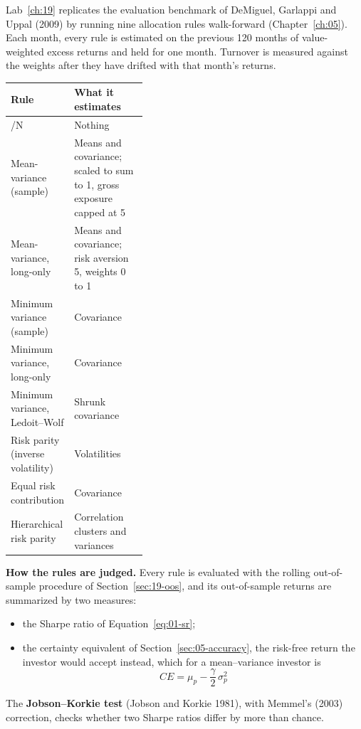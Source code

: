 Lab~\ref{ch:19} replicates the evaluation benchmark of DeMiguel, Garlappi and Uppal (2009) by running nine allocation rules walk-forward (Chapter~\ref{ch:05}). Each month, every rule is estimated on the previous 120 months of value-weighted excess returns and held for one month. Turnover is measured against the weights after they have drifted with that month's returns.

\begin{center}
\small
\begin{tabularx}{0.9\linewidth}{@{}>{\raggedright\arraybackslash}p{0.38\linewidth}>{\raggedright\arraybackslash}X@{}}
\toprule
Rule & What it estimates \\
\midrule
1/N & Nothing \\
Mean-variance (sample) & Means and covariance; scaled to sum to 1, gross exposure capped at 5 \\
Mean-variance, long-only & Means and covariance; risk aversion 5, weights 0 to 1 \\
Minimum variance (sample) & Covariance \\
Minimum variance, long-only & Covariance \\
Minimum variance, Ledoit--Wolf & Shrunk covariance \\
Risk parity (inverse volatility) & Volatilities \\
Equal risk contribution & Covariance \\
Hierarchical risk parity & Correlation clusters and variances \\
\bottomrule
\end{tabularx}
\end{center}

\textbf{How the rules are judged.} Every rule is evaluated with the rolling out-of-sample procedure of Section~\ref{sec:19-oos}, and its out-of-sample returns are summarized by two measures:
\begin{itemize}
  \item the Sharpe ratio of Equation~\eqref{eq:01-sr};
  \item the certainty equivalent of Section~\ref{sec:05-accuracy}, the risk-free return the investor would accept instead, which for a mean--variance investor is
  \begin{equation}
    CE = \mu_p - \frac{\gamma}{2}\,\sigma_p^2
    \label{eq:19-ce}
  \end{equation}
\end{itemize}

The \textbf{Jobson--Korkie test} (Jobson and Korkie 1981), with Memmel's (2003) correction, checks whether two Sharpe ratios differ by more than chance.

